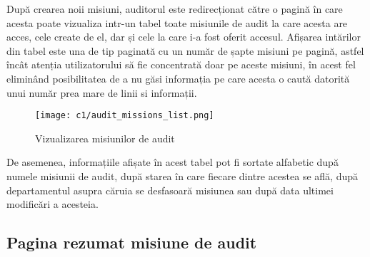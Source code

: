 După crearea noii misiuni, auditorul este redirecționat către o pagină în care acesta poate vizualiza intr-un tabel toate misiunile de audit la care acesta are acces, cele create de el, dar și cele la care i-a fost oferit accesul. Afișarea intărilor din tabel este una de tip paginată cu un număr de șapte misiuni pe pagină, astfel încât atenția utilizatorului să fie concentrată doar pe aceste misiuni, în acest fel eliminând posibilitatea de a nu găsi informația pe care acesta o caută datorită unui număr prea mare de linii si informații.
	\vspace{0.5 cm}
\begin{figure}[h]
	\centering
	
	\texttt{[image: c1/audit\_missions\_list.png]}
	\caption{Vizualizarea misiunilor de audit}
\end{figure}

De asemenea, informațiile afișate în acest tabel pot fi sortate alfabetic după numele misiunii de audit, după starea în care fiecare dintre acestea se află, după departamentul asupra căruia se desfasoară misiunea  sau după data ultimei modificări a acesteia.

\subsection{Pagina rezumat misiune de audit}

